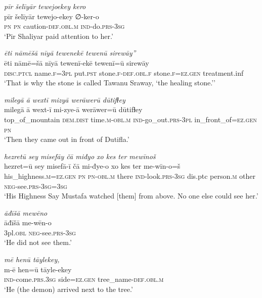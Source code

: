 \ea \label{ŽP.182}
\textit{pīr šelīyār tewejoekey kero} \\ 
\gll pīr šelīyār tewejo-ekey ∅-ker-o \\ 
 \textsc{pn} \textsc{pn} caution\textsc{-def}\textsc{.obl}\textsc{.m} \textsc{ind-}do\textsc{.prs}\textsc{-3sg} \\ 
\glt `Pir Shaliyar paid attention to her.'
\z 
 
\ea \label{ŽP.185}
\textit{ēti nāmēšā nīyā tewenekē tewenū sirewāy”} \\ 
\gll ēti nāmē=šā nīyā tewenī-ekē tewenī=ū sirewāy \\ 
 \textsc{disc.ptcl} name\textsc{.f}\textsc{=3pl} put\textsc{.pst} stone\textsc{.f}\textsc{-def}\textsc{.obl}\textsc{.f} stone\textsc{.f}\textsc{\textsc{=ez.gen}} treatment.inf \\ 
\glt `That is why the stone is called Tawanu Sraway, ‘the healing stone.’'
\z 
 
\ea \label{ŽP.187}
\textit{milegā ā wextī mizyā werāwerū dūtifɫey} \\ 
\gll milegā ā wext-ī mi-zye-ā werāwer=ū dūtifɫey \\ 
 top\_of\_mountain \textsc{dem.dist} time\textsc{.m}\textsc{-obl}\textsc{.m} \textsc{ind-}go\_out\textsc{.prs}\textsc{-3pl} in\_front\_of\textsc{\textsc{=ez.gen}} \textsc{pn} \\ 
\glt `Then they came out in front of  Dutifla.'
\z 
 
\ea \label{ŽP.189}
\textit{hezretū sey misefāy čā miđyo xo kes ter mewīnoš} \\ 
\gll hezret=ū sey misefā-ī čā mi-đye-o xo kes ter me-wīn-o=š \\ 
 his\_highness\textsc{.m}\textsc{\textsc{=ez.gen}} \textsc{pn} \textsc{pn}\textsc{-obl}\textsc{.m} there \textsc{ind-}look\textsc{.prs}\textsc{-3sg} dis.ptc person\textsc{.m} other \textsc{neg-}see\textsc{.prs}\textsc{-3sg}\textsc{=3sg} \\ 
\glt `His Highness Say Mustafa watched [them] from above. No one else could see her.'
\z 
 
\ea \label{ŽP.190}
\textit{āđīšā mewēno} \\ 
\gll āđīšā me-wēn-o \\ 
 3pl\textsc{.obl} \textsc{neg-}see\textsc{.prs}\textsc{-3sg} \\ 
\glt `He did not see them.'
\z 
 
\ea \label{ŽP.197}
\textit{mē henū tāylekey,} \\ 
\gll m-ē hen=ū tāyle-ekey \\ 
 \textsc{ind-}come\textsc{.prs}\textsc{.3sg} side\textsc{\textsc{=ez.gen}} tree\_name\textsc{-def}\textsc{.obl}\textsc{.m} \\ 
\glt `He (the demon) arrived next to the tree.'
\z 
 
